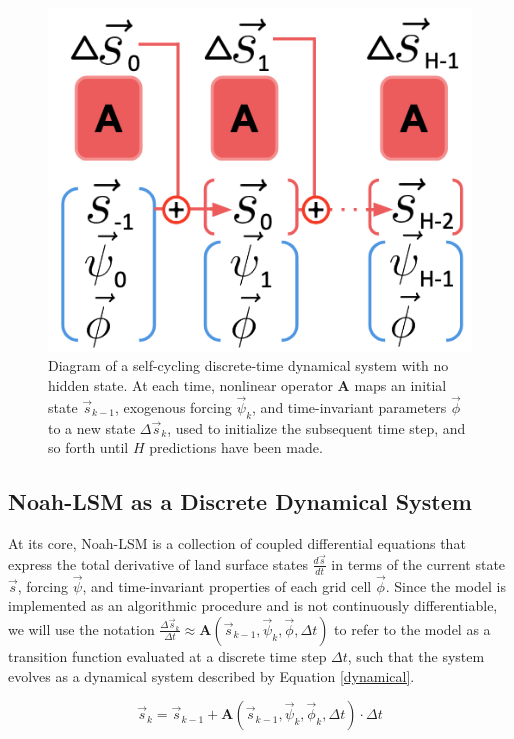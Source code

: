 \begin{figure}[h]
    \centering

    \includegraphics[width=.66\linewidth]{figures/schematic_scann.png}

    \caption{Diagram of a self-cycling discrete-time dynamical system with no hidden state. At each time, nonlinear operator \textbf{A} maps an initial state $\vec{s}_{k-1}$, exogenous forcing $\vec{\psi}_k$, and time-invariant parameters $\vec{\phi}$ to a new state $\Delta \vec{s}_k$, used to initialize the subsequent time step, and so forth until $H$ predictions have been made.}
    \label{scann}
\end{figure}

\subsection{Noah-LSM as a Discrete Dynamical System}

At its core, Noah-LSM is a collection of coupled differential equations that express the total derivative of land surface states $\frac{d\vec{s}}{dt}$ in terms of the current state $\vec{s}$, forcing $\vec{\psi}$, and time-invariant properties of each grid cell $\vec{\phi}$. Since the model is implemented as an algorithmic procedure and is not continuously differentiable, we will use the notation $\frac{\Delta \vec{s}_k}{\Delta t} \approx \mathbf{A}(\vec{s}_{k-1}, \vec{\psi}_k, \vec{\phi}, \Delta t)$ to refer to the model as a transition function evaluated at a discrete time step $\Delta t$, such that the system evolves as a dynamical system described by Equation \ref{dynamical}.

\begin{equation}\label{dynamical}
    \vec{s}_k = \vec{s}_{k-1} + \mathbf{A}(\vec{s}_{k-1}, \vec{\psi}_k, \vec{\phi}_k, \Delta t) \cdot \Delta t
\end{equation}

